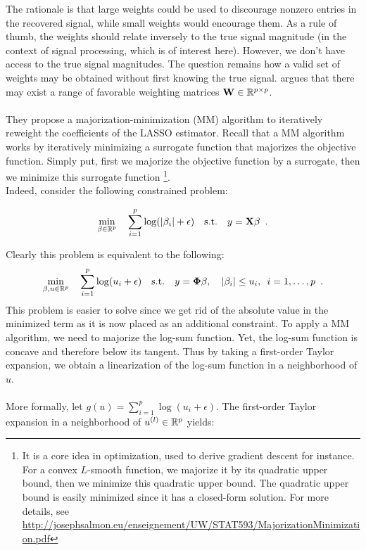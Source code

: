 \documentclass[a4paper,10pt]{article}
\theoremstyle{definition}
\begin{document}
The rationale is that large weights could be used to discourage nonzero entries in the recovered signal, while small weights would encourage them. As a rule of thumb, the weights should relate inversely
to the true signal magnitude (in the context of signal processing, which is of interest here). However, we don't have access to the true signal magnitudes. The question remains how a valid set of weights
may be obtained without first knowing the true signal. \cite{Candes_Wakin_Boyd08} argues that there may exist a range of favorable weighting matrices $\mathbf{W} \in \mathbb{R}^{p \times p}$.
\\
\\
They propose a majorization-minimization (MM) algorithm to iteratively reweight the coefficients of the LASSO estimator.
Recall that a MM algorithm works by iteratively minimizing a surrogate function that majorizes the objective function.
Simply put, first we majorize the objective function by a surrogate, then we minimize this surrogate function \footnote{It is a core idea in optimization, used to derive gradient descent for instance.
For a convex $L$-smooth function, we majorize it by its quadratic upper bound, then we minimize this quadratic upper bound.
The quadratic upper bound is easily minimized since it has a closed-form solution.
For more details, see \url{http://josephsalmon.eu/enseignement/UW/STAT593/MajorizationMinimization.pdf}}.
\\
Indeed, consider the following constrained problem:

\begin{equation*}
    \min_{\beta \in \mathbb{R}^p}
    \quad \sum_{i=1}^p \log(\lvert \beta_i \rvert + \epsilon)
    \quad \textrm{s.t.} \quad  y = \mathbf{X} \beta
    \enspace .
\end{equation*}
%

Clearly this problem is equivalent to the following:
\begin{equation*}
    \min_{\beta,u \in \mathbb{R}^p}
    \quad \sum_{i=1}^p \log(u_i + \epsilon)
    \quad \textrm{s.t.} \quad  y = \mathbf{\Phi} \beta,
    \quad \lvert \beta_i \rvert \leq u_i, \enspace i=1,\dots,p
    \enspace .
\end{equation*}
%
This problem is easier to solve since we get rid of the absolute value in the minimized term as it is now placed as an additional constraint.
To apply a MM algorithm, we need to majorize the log-sum function. Yet, the log-sum function is concave and therefore below its tangent. Thus by taking a first-order Taylor expansion, we obtain a linearization of
the log-sum function in a neighborhood of $u$.
\\
\\
More formally, let $g(u) = \sum_{i=1}^p \log(u_i + \epsilon)$. The first-order Taylor expansion in a neighborhood of $u^{(l)} \in \mathbb{R}^p$ yields:
\end{document}

